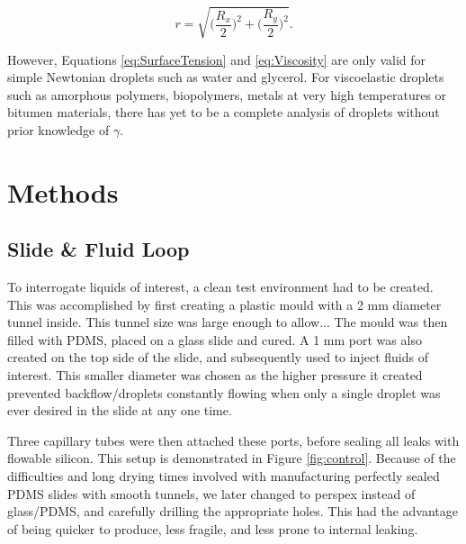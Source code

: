 \documentclass{physics_article_B}
\begin{document}
            \begin{equation}\label{eq:radii}
                r = \sqrt{\Big(\frac{R_x}{2}\Big)^2 + \Big(\frac{R_y}{2}\Big)^2} .
            \end{equation}
    
However, Equations \ref{eq:SurfaceTension} and \ref{eq:Viscosity} are only valid for simple Newtonian droplets such as water and glycerol. For viscoelastic droplets such as amorphous polymers, biopolymers, metals at very high temperatures or bitumen materials, there has yet to be a complete analysis of droplets without prior knowledge of $\gamma$.
\section{Methods\label{sect:method}}

    \subsection{Slide \& Fluid Loop\label{sect:method:slide}}
    
        To interrogate liquids of interest, a clean test environment had to be created. This was accomplished by first creating a plastic mould with a 2 mm diameter tunnel inside. This tunnel size was large enough to allow...  The mould was then filled with PDMS, placed on a glass slide and cured. A 1 mm port was also created on the top side of the slide, and subsequently used to inject fluids of interest. This smaller diameter was chosen as the higher pressure it created prevented backflow/droplets constantly flowing when only a single droplet was ever desired in the slide at any one time.
        
        Three capillary tubes were then attached these ports, before sealing all leaks with flowable silicon. This setup is demonstrated in Figure \ref{fig:control}. Because of the difficulties and long drying times involved with manufacturing perfectly sealed PDMS slides with smooth tunnels, we later changed to perspex instead of glass/PDMS, and carefully drilling the appropriate holes. This had the advantage of being quicker to produce, less fragile, and less prone to internal leaking. 
        
\end{document}
